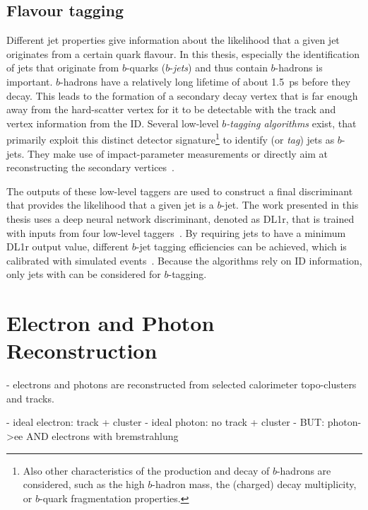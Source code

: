 \subsection{Flavour tagging}
Different jet properties give information about the likelihood that a given jet originates from a certain quark flavour. 
In this thesis, especially the identification of jets that originate from $b$-quarks ($b$-\emph{jets}) and thus contain $b$-hadrons is important. $b$-hadrons have a relatively long lifetime of about \SI{1.5}{\pico\second} before they decay. This leads to the formation of a secondary decay vertex that is far enough away from the hard-scatter vertex for it to be detectable with the track and vertex information from the ID. 
Several low-level \emph{$b$-tagging algorithms} exist, that primarily exploit this distinct detector signature\footnote{Also other characteristics of the production and decay of $b$-hadrons are considered, such as the high $b$-hadron mass, the (charged) decay multiplicity, or $b$-quark fragmentation properties.} to identify (or \emph{tag}) jets as $b$-jets. They make use of impact-parameter measurements or directly aim at reconstructing the secondary vertices~\cite{ATL-PHYS-PUB-2017-013}.

The outputs of these low-level taggers are used to construct a final discriminant that provides the likelihood that a given jet is a $b$-jet. The work presented in this thesis uses a deep neural network discriminant, denoted as DL1r, that is trained with inputs from four low-level taggers~\cite{ATL-PHYS-PUB-2017-013}.
By requiring jets to have a minimum DL1r output value, different $b$-jet tagging efficiencies can be achieved, which is calibrated with simulated \ttbar events~\cite{FTAG-2018-01}. 
Because the algorithms rely on ID information, only jets with  can be considered for $b$-tagging.



\section{Electron and Photon Reconstruction}
\label{sec:electron-photon-reconstruction}

- electrons and photons are reconstructed from selected calorimeter topo-clusters and tracks.

- ideal electron: track + cluster
- ideal photon: no track + cluster
- BUT: photon->ee AND electrons with bremstrahlung

